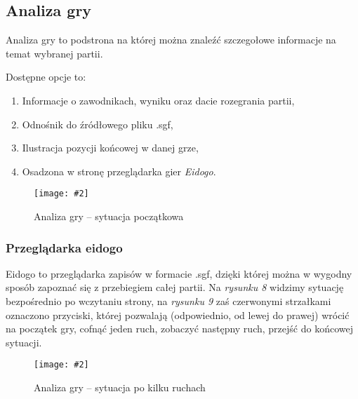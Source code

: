 \documentclass[10pt,leqno]{article}
\newcommand{\myimage}[3]{
  \begin{figure}[h!]
    \centering
      \texttt{[image: \#2]}
  \caption{#3}
  \end{figure}
}
\begin{document}
\subsection{Analiza gry}
Analiza gry to podstrona na której można znaleźć szczegołowe informacje na temat wybranej partii.

Dostępne opcje to:
\begin{enumerate}
\item Informacje o zawodnikach, wyniku oraz dacie rozegrania partii,
\item Odnośnik do źródłowego pliku .sgf,
\item Ilustracja pozycji końcowej w danej grze,
\item Osadzona w stronę przeglądarka gier \emph{Eidogo}.
\end{enumerate}

\myimage{0.47}{gameDetailsMain.png}{Analiza gry -- sytuacja początkowa}

\subsubsection{Przeglądarka eidogo}
  Eidogo to przeglądarka zapisów w formacie .sgf, dzięki której można w wygodny sposób zapoznać się z przebiegiem całej partii. 
  Na \emph{rysunku 8} widzimy sytuację bezpośrednio po wczytaniu strony, na \emph{rysunku 9} zaś czerwonymi strzałkami oznaczono przyciski,
  której pozwalają (odpowiednio, od lewej do prawej) wrócić na początek gry, cofnąć jeden ruch, zobaczyć następny ruch,
  przejść do końcowej sytuacji.
   
\myimage{0.47}{gameDetails.png}{Analiza gry -- sytuacja po kilku ruchach}

\end{document}
